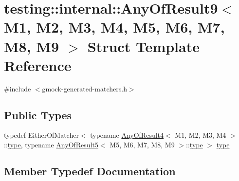 \hypertarget{structtesting_1_1internal_1_1AnyOfResult9}{}\section{testing\+::internal\+::Any\+Of\+Result9$<$ M1, M2, M3, M4, M5, M6, M7, M8, M9 $>$ Struct Template Reference}
\label{structtesting_1_1internal_1_1AnyOfResult9}


{\ttfamily \#include $<$gmock-\/generated-\/matchers.\+h$>$}

\subsection*{Public Types}
\begin{DoxyCompactItemize}
\item 
typedef Either\+Of\+Matcher$<$ typename \mbox{\hyperlink{structtesting_1_1internal_1_1AnyOfResult4}{Any\+Of\+Result4}}$<$ M1, M2, M3, M4 $>$\+::\mbox{\hyperlink{structtesting_1_1internal_1_1AnyOfResult9_a308935fb02c62f502044dcc7b0a2b464}{type}}, typename \mbox{\hyperlink{structtesting_1_1internal_1_1AnyOfResult5}{Any\+Of\+Result5}}$<$ M5, M6, M7, M8, M9 $>$\+::\mbox{\hyperlink{structtesting_1_1internal_1_1AnyOfResult9_a308935fb02c62f502044dcc7b0a2b464}{type}} $>$ \mbox{\hyperlink{structtesting_1_1internal_1_1AnyOfResult9_a308935fb02c62f502044dcc7b0a2b464}{type}}
\end{DoxyCompactItemize}


\subsection{Member Typedef Documentation}
\mbox{\label{structtesting_1_1internal_1_1AnyOfResult9_a308935fb02c62f502044dcc7b0a2b464}} 
